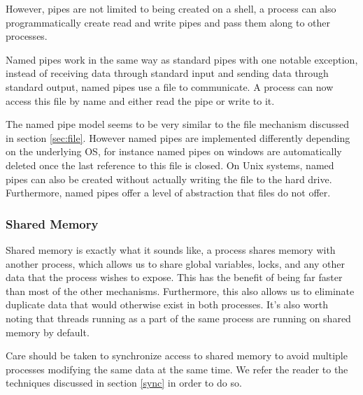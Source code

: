 However, pipes are not limited to being created on a shell, a process can also programmatically create read and write pipes and pass them along to other processes.

Named pipes work in the same way as standard pipes with one notable exception, instead of receiving data through standard input and sending data through standard output, named pipes use a file to communicate. A process can now access this file by name and either read the pipe or write to it. 

The named pipe model seems to be very similar to the file mechanism discussed in section \ref{sec:file}. However named pipes are implemented differently depending on the underlying OS, for instance named pipes on windows are automatically deleted once the last reference to this file is closed. On Unix systems, named pipes can also be created without actually writing the file to the hard drive. Furthermore, named pipes offer a level of abstraction that files do not offer.

\subsubsection{Shared Memory}
Shared memory is exactly what it sounds like, a process shares memory with another process, which allows us to share global variables, locks, and any other data that the process wishes to expose. This has the benefit of being far faster than most of the other mechanisms. Furthermore, this also allows us to eliminate duplicate data that would otherwise exist in both processes. It's also worth noting that threads running as a part of the same process are running on shared memory by default.

Care should be taken to synchronize access to shared memory to avoid multiple processes modifying the same data at the same time. We refer the reader to the techniques discussed in section \ref{sync} in order to do so.
